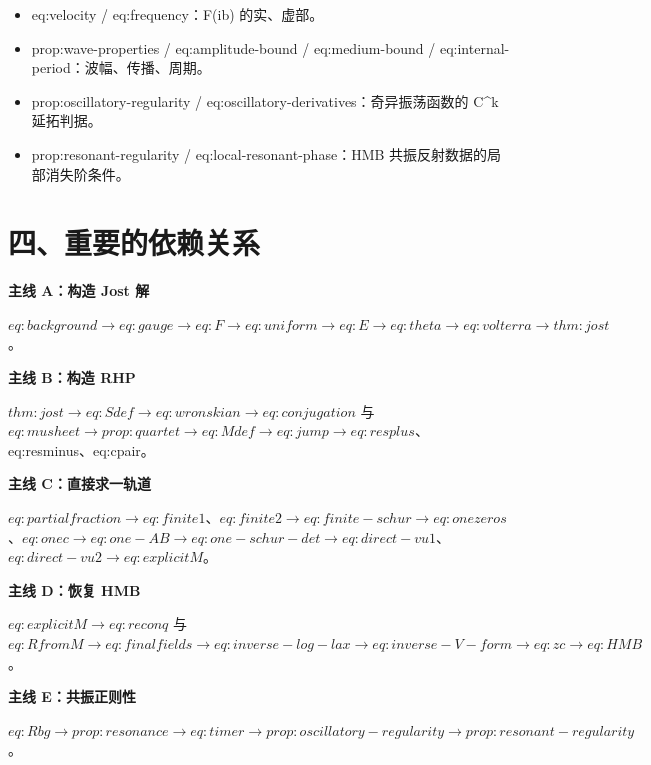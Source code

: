 \begin{itemize}[leftmargin=2em]
\item eq:velocity / eq:frequency：F(ib) 的实、虚部。
\item prop:wave-properties / eq:amplitude-bound / eq:medium-bound / eq:internal-period：波幅、传播、周期。
\item prop:oscillatory-regularity / eq:oscillatory-derivatives：奇异振荡函数的 C\textasciicircum{}k 延拓判据。
\item prop:resonant-regularity / eq:local-resonant-phase：HMB 共振反射数据的局部消失阶条件。
\end{itemize}

\section{四、重要的依赖关系}

\textbf{主线 A：构造 Jost 解}\par

$eq:background \to{} eq:gauge \to{} eq:F \to{} eq:uniform \to{} eq:E \to{} eq:theta \to{} eq:volterra \to{} thm:jost$。\par

\textbf{主线 B：构造 RHP}\par

$thm:jost \to{} eq:Sdef \to{} eq:wronskian \to{} eq:conjugation$ 与 $eq:musheet \to{} prop:quartet \to{} eq:Mdef \to{} eq:jump \to{} eq:resplus$、eq:resminus、eq:cpair。\par

\textbf{主线 C：直接求一轨道}\par

$eq:partialfraction \to{} eq:finite1$、$eq:finite2 \to{} eq:finite-schur \to{} eq:onezeros$、$eq:onec \to{} eq:one-AB \to{} eq:one-schur-det \to{} eq:direct-vu1$、$eq:direct-vu2 \to{} eq:explicitM$。\par

\textbf{主线 D：恢复 HMB}\par

$eq:explicitM \to{} eq:reconq$ 与 $eq:RfromM \to{} eq:finalfields \to{} eq:inverse-log-lax \to{} eq:inverse-V-form \to{} eq:zc \to{} eq:HMB$。\par

\textbf{主线 E：共振正则性}\par

$eq:Rbg \to{} prop:resonance \to{} eq:timer \to{} prop:oscillatory-regularity \to{} prop:resonant-regularity$。\par

